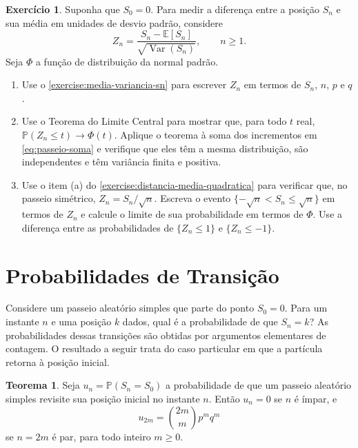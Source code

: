 \documentclass[12pt,portuguese]{article}
\theoremstyle{definition}
\newtheorem{theorem}{Teorema}
\theoremstyle{plainexercise}
\newtheorem{exercise}{Exercício}
\theoremstyle{starredexercise}
\theoremstyle{definition}
\begin{document}
\begin{exercise}\label{exercise:limite-central}
Suponha que $S_0 = 0$. Para medir a diferença entre a posição $S_n$ e sua
média em unidades de desvio padrão, considere
\[
  Z_n = \frac{S_n - \mathbb{E}[S_n]}{\sqrt{\operatorname{Var}(S_n)}},
  \qquad n \geqslant 1.
\]
Seja $\Phi$ a função de distribuição da normal padrão.
\begin{enumerate}[label=(\alph*)]
  \item Use o \cref{exercise:media-variancia-sn} para escrever $Z_n$ em
  termos de $S_n$, $n$, $p$ e $q$.
  \item Use o Teorema do Limite Central para mostrar que, para todo $t$ real,
  $\mathbb{P}(Z_n \leqslant t) \to \Phi(t)$. Aplique o teorema à soma dos
  incrementos em \eqref{eq:passeio-soma} e verifique que eles têm a mesma
  distribuição, são independentes e têm variância finita e positiva.
  \item Use o item (a) do \cref{exercise:distancia-media-quadratica} para
  verificar que, no passeio simétrico, $Z_n = S_n/\sqrt{n}$. Escreva o evento
  $\{-\sqrt{n} < S_n \leqslant \sqrt{n}\}$ em termos de $Z_n$ e calcule o
  limite de sua probabilidade em termos de $\Phi$. Use a diferença entre
  as probabilidades de $\{Z_n \leqslant 1\}$ e $\{Z_n \leqslant -1\}$.
\end{enumerate}
\end{exercise}

\section{Probabilidades de Transição}\label{sec:probabilidades-transicao}

Considere um passeio aleatório simples que parte do ponto $S_0 = 0$. Para um
instante $n$ e uma posição $k$ dados, qual é a probabilidade de que
$S_n = k$? As probabilidades dessas transições são obtidas por argumentos
elementares de contagem. O resultado a seguir trata do caso particular em que
a partícula retorna à posição inicial.

\begin{theorem}\label{thm:retorno-origem}
Seja $u_n = \mathbb{P}(S_n = S_0)$ a probabilidade de que um passeio aleatório
simples revisite sua posição inicial no instante $n$. Então $u_n = 0$ se $n$
é ímpar, e
\begin{equation}\label{eq:retorno-par}
  u_{2m} = \binom{2m}{m} p^m q^m
\end{equation}
se $n = 2m$ é par, para todo inteiro $m \geqslant 0$.
\end{theorem}
\end{document}
